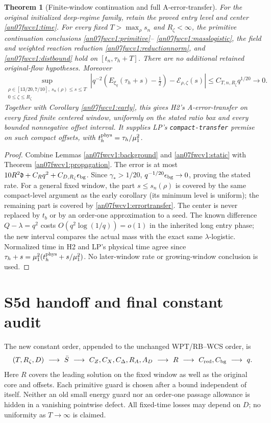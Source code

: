\documentclass[11pt]{article}
\numberwithin{equation}{section}
\newtheorem{theorem}{Theorem}[section]
\newcommand{\dist}{\mathfrak d}\newcommand{\one}{\mathbf1}
\begin{document}
\begin{theorem}[Finite-window continuation and full A-error-transfer]
\label{an07fwcv1:main}
For the original initialized deep-regime family, retain the proved
entry level and center \eqref{an07fwcv1:time}. For every fixed
\(T>\max_\rho s_n\) and \(R_\zeta<\infty\), the primitive
continuation conclusions \eqref{an07fwcv1:primitive}--
\eqref{an07fwcv1:masslogistic}, the field and weighted reaction
reduction \eqref{an07fwcv1:reductionnorm}, and
\eqref{an07fwcv1:distbound} hold on \([t_n,\tau_h+T]\).
There are no additional retained original-flow hypotheses.
Moreover
\begin{equation}
 \sup_{\substack{\rho\in[13/20,7/10],\ s_n(\rho)\le s\le T\\
                       0\le\zeta\le R_\zeta}}
 \left|q^{-2}(E_{\xi_q}(\tau_h+s)-\tfrac12)
              -\mathcal E_{\rho,\zeta}(s)\right|
 \le C_{T,n,R_\zeta}q^{1/20}\longrightarrow0.
 \label{an07fwcv1:errortransfer}
\end{equation}
Together with Corollary \ref{an07fwcv1:early}, this gives H2's
A-error-transfer on every fixed finite centered window,
uniformly on the stated ratio box and every bounded nonnegative
offset interval. It supplies LP's \texttt{compact-transfer}
premise on such compact offsets, with
\(t_h^{\rm phys}=\tau_h/\mu_1^2\).
\end{theorem}
\begin{proof}
Combine Lemmas \ref{an07fwcv1:background} and
\ref{an07fwcv1:static} with Theorem \ref{an07fwcv1:propagation}.
The error is at most
\(10R^2\dist+C_Rq^2+C_{D,R_\zeta}\epsilon_{\rm bg}\).
Since \(\gamma_*>1/20\),
\(q^{-1/20}\epsilon_{\rm bg}\to0\), proving the stated rate.
For a general fixed window, the part \(s\le s_n(\rho)\)
is covered by the same compact-level argument as the early
corollary (its minimum level is uniform); the remaining part
is covered by \eqref{an07fwcv1:errortransfer}.
The center is never replaced by \(t_b\) or by an order-one
approximation to a seed. The known difference \(Q-\lambda=q^2\)
costs \(O(q^2\log(1/q))=o(1)\) in the inherited long entry phase;
the new interval compares the actual mass with the exact same
\(\lambda\)-logistic. Normalized time in H2 and LP's physical
time agree since
\(\tau_h+s=\mu_1^2(t_h^{\rm phys}+s/\mu_1^2)\).
No later-window rate or growing-window conclusion is used.
\end{proof}

\section{S5d handoff and final constant audit}
\label{an07fwcv1:handoff}
The new constant order, appended to the unchanged WPT/RB--WCS
order, is
\[
 (T,R_\zeta,D)\ \longrightarrow\ \bar S\
 \longrightarrow\ C_Z,C_X,C_\Delta,R_A,A_D\
 \longrightarrow\ R\ \longrightarrow\ C_{\rm red},C_{\rm bg}\
 \longrightarrow\ q.
\]
Here \(R\) covers the leading solution on the fixed window as
well as the original core and offsets. Each primitive guard is
chosen after a bound independent of itself. Neither an old small
energy guard nor an order-one passage allowance is hidden in a
vanishing pointwise defect. All fixed-time losses may depend on
\(D\); no uniformity as \(T\to\infty\) is claimed.
\end{document}
